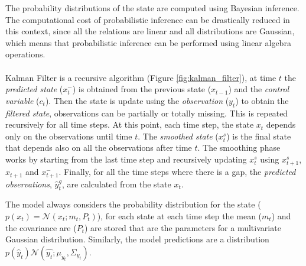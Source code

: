 \documentclass{article}
\newcommand{\norm}[3]{\mathcal{N}\left(#1; #2, #3\right)} %
\begin{document}
The probability distributions of the state are computed using Bayesian inference. The computational cost of probabilistic inference can be drastically reduced in this context, since all the relations are linear and all distributions are Gaussian, which means that probabilistic inference can be performed using linear algebra operations.

\paragraph{} Kalman Filter is a recursive algorithm (Figure \ref{fig:kalman_filter}), at time $t$ the \textit{predicted state} ($x^-_t$) is obtained from the previous state ($x_{t-1}$) and the \textit{control variable} ($c_t$). Then the state is update using the \textit{observation} ($y_t$) to obtain the \textit{filtered state}, observations can be partially or totally missing. This is repeated recursively for all time steps. At this point, each time step, the state $x_t$ depends only on the observations until time $t$. The \textit{smoothed state} ($x^s_t$) is the final state that depends also on all the observations after time $t$. The smoothing phase works by starting from the last time step and recursively updating $x^s_t$ using $x^s_{t+1}$, $x_{t+1}$ and $x^-_{t+1}$.
Finally, for all the time steps where there is a gap, the \textit{predicted observations}, $\hat{y}^g_t$, are calculated from the state $x_t$.

The model always considers the probability distribution for the state ($p(x_t) = \norm{x_t}{m_t}{P_t}$), for each state at each time step the mean ($m_t$) and the covariance are ($P_t$) are stored that are the parameters for a multivariate Gaussian distribution. Similarly, the model predictions are a distribution $p(\hat{y}_t) \norm{\hat{y_t}}{\mu_{y_t}}{\Sigma_{y_t}}$.
\end{document}
